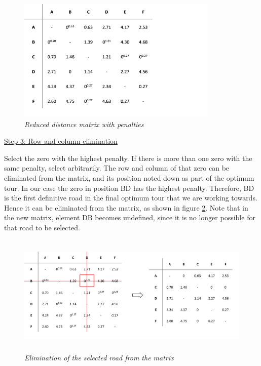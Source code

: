 \begin{figure}[H] 
	\centering
	\includegraphics[height=5.9cm]{dmpenalties}
	\vspace{-3mm}
	\caption{\textsl{Reduced distance matrix with penalties}}
	\label{dmpenalties}
\end{figure}	
	
\vspace{5mm}	

\noindent
\underline{Step 3: Row and column elimination}
\vspace{1mm}

\noindent
Select the zero with the highest penalty. If there is more than one zero with the same penalty, select arbitrarily. The row and column of that zero can be eliminated from the matrix, and its position noted down as part of the optimum tour. In our case the zero in position BD has the highest penalty. Therefore, BD is the first definitive road in the final optimum tour that we are working towards. Hence it can be eliminated from the matrix, as shown in figure \ref{dmelimination2}. Note that in the new matrix, element DB becomes undefined, since it is no longer possible for that road to be selected.

\begin{figure}[H] 
	\centering
	\includegraphics[height=5.8cm]{dmelimination2}
	\vspace{-4mm}
	\caption{\textsl{Elimination of the selected road from the matrix}}
	\label{dmelimination2}
\end{figure}

